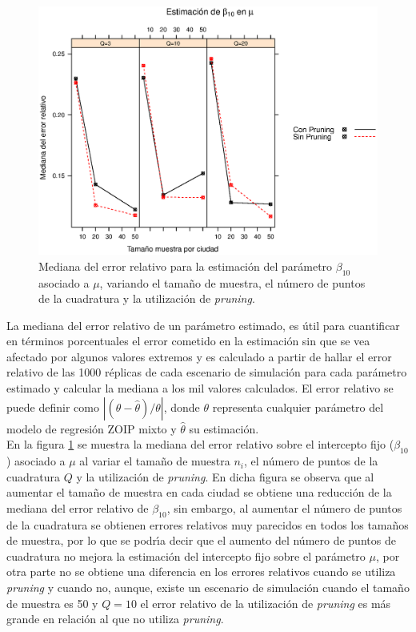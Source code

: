 \begin{figure}
	\begin{center}
		\includegraphics[scale=0.6]{MAPE_beta0_mu.eps}	
		\caption{Mediana del error relativo para la estimaci\'{o}n del par\'{a}metro $\beta_{10}$ asociado a $\mu$, variando el tama\~{n}o de muestra, el n\'{u}mero de puntos de la cuadratura y  la utilizaci\'{o}n de \textit{pruning}.}
		\label{MAPE_bo_mu}
	\end{center}
\end{figure}

La mediana del error relativo de un par\'{a}metro estimado, es \'{u}til para cuantificar en t\'{e}rminos porcentuales el error cometido en la estimaci\'{o}n sin que se vea afectado por algunos valores extremos y es calculado a partir de hallar el error relativo de las 1000 r\'{e}plicas de cada escenario de simulaci\'{o}n para cada par\'{a}metro estimado y calcular la mediana a los mil valores calculados. El error relativo se puede definir como $|(\theta-\hat{\theta})/\theta|$, donde $\theta$ representa cualquier par\'{a}metro del modelo de regresi\'{o}n ZOIP mixto y $\hat{\theta}$ su estimaci\'{o}n.\\

En la figura \ref{MAPE_bo_mu} se muestra la mediana del error relativo sobre el intercepto fijo ($\beta_{10}$) asociado a $\mu$ al variar el tama\~{n}o de muestra $n_i$, el n\'{u}mero de puntos de la cuadratura $Q$ y la utilizaci\'{o}n de \textit{pruning}. En dicha figura se observa que al aumentar el tama\~{n}o de muestra en cada ciudad se obtiene una reducci\'{o}n de la mediana del error relativo de $\beta_{10}$, sin embargo, al aumentar el n\'{u}mero de puntos de la cuadratura se obtienen errores relativos muy parecidos en todos los tama\~{n}os de muestra, por lo que se podr\'{\i}a decir que el aumento del n\'{u}mero de puntos de cuadratura no mejora la estimaci\'{o}n del intercepto fijo sobre el par\'{a}metro $\mu$, por otra parte no se obtiene una diferencia en los errores relativos cuando se utiliza \textit{pruning} y cuando no, aunque, existe un escenario de simulaci\'{o}n cuando el tama\~{n}o de muestra es 50 y $Q=10$ el error relativo de la utilizaci\'{o}n de \textit{pruning} es m\'{a}s grande en relaci\'{o}n al que no utiliza \textit{pruning}.\\



